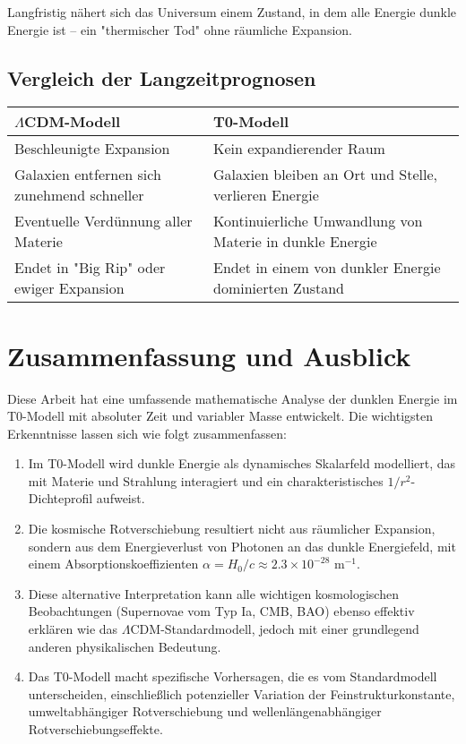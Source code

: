 \documentclass[a4paper,12pt]{article}
\theoremstyle{definition}
\theoremstyle{remark}
\begin{document}
	Langfristig nähert sich das Universum einem Zustand, in dem alle Energie dunkle Energie ist – ein "thermischer Tod" ohne räumliche Expansion.
	
	\subsection{Vergleich der Langzeitprognosen}
	\begin{tcolorbox}[colback=yellow!5!white,colframe=yellow!75!black,title=Langzeitentwicklung des Universums]
		\begin{tabular}{|p{}|p{}|}
			\hline
			\textbf{$\Lambda$CDM-Modell} & \textbf{T0-Modell} \\
			\hline
			Beschleunigte Expansion & Kein expandierender Raum \\
			\hline
			Galaxien entfernen sich zunehmend schneller & Galaxien bleiben an Ort und Stelle, verlieren Energie \\
			\hline
			Eventuelle Verdünnung aller Materie & Kontinuierliche Umwandlung von Materie in dunkle Energie \\
			\hline
			Endet in "Big Rip" oder ewiger Expansion & Endet in einem von dunkler Energie dominierten Zustand \\
			\hline
		\end{tabular}
	\end{tcolorbox}
	
	\section{Zusammenfassung und Ausblick}
	Diese Arbeit hat eine umfassende mathematische Analyse der dunklen Energie im T0-Modell mit absoluter Zeit und variabler Masse entwickelt. Die wichtigsten Erkenntnisse lassen sich wie folgt zusammenfassen:
	
	\begin{enumerate}
		\item Im T0-Modell wird dunkle Energie als dynamisches Skalarfeld modelliert, das mit Materie und Strahlung interagiert und ein charakteristisches $1/r^2$-Dichteprofil aufweist.
		\item Die kosmische Rotverschiebung resultiert nicht aus räumlicher Expansion, sondern aus dem Energieverlust von Photonen an das dunkle Energiefeld, mit einem Absorptionskoeffizienten $\alpha = H_0/c \approx 2.3 \times 10^{-28} \text{ m}^{-1}$.
		\item Diese alternative Interpretation kann alle wichtigen kosmologischen Beobachtungen (Supernovae vom Typ Ia, CMB, BAO) ebenso effektiv erklären wie das $\Lambda$CDM-Standardmodell, jedoch mit einer grundlegend anderen physikalischen Bedeutung.
		\item Das T0-Modell macht spezifische Vorhersagen, die es vom Standardmodell unterscheiden, einschließlich potenzieller Variation der Feinstrukturkonstante, umweltabhängiger Rotverschiebung und wellenlängenabhängiger Rotverschiebungseffekte.
	\end{enumerate}
	
\end{document}
